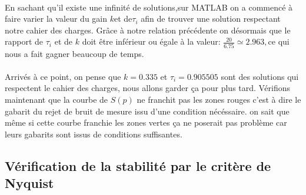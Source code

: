 \documentclass[12pt, a4paper, openany]{report}
\begin{document}
  \paragraph{}  
  En sachant qu'il existe une infinité de solutions,sur MATLAB on a commencé à faire varier la valeur du gain $k$\hspace{1mm}et de\hspace{1mm}$\tau_{i} $ afin de trouver une solution respectant notre  cahier des charges. Grâce à notre relation précédente on désormais que le rapport de $\tau_{i} $ et de  $k$ doit être inférieur  ou égale à la valeur: $\frac{20}{6.75} \simeq 2.963, $\hspace{1mm}ce qui nous a fait gagner beaucoup de temps.\\
  
 \begin{center}
     \label{fig13}
 \end{center}
 
 \paragraph{}
 Arrivés à ce point, on pense que $k=0.335$ et $\tau_{i}=0.905505$ sont des solutions qui respectent le cahier des charges, nous allons garder ça pour plus tard. Vérifions maintenant que la courbe de $S(p)$ ne franchit pas les zones rouges c'est à dire le gabarit du rejet de bruit de mesure issu d'une condition nécéssaire. on sait que même si cette courbe franchie les zones vertes ça ne poserait pas problème car leurs gabarits sont issus de conditions suffisantes.\\
 
 
\begin{center}
     \label{fig14}
 \end{center} 
 
 \begin{center}
     \label{fig15}
 \end{center} 
 
  \subsection{Vérification de la stabilité par le critère de Nyquist}
   
\end{document}
